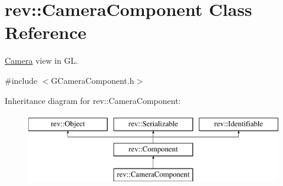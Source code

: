 \hypertarget{classrev_1_1_camera_component}{}\section{rev\+::Camera\+Component Class Reference}
\label{classrev_1_1_camera_component}


\mbox{\hyperlink{classrev_1_1_camera}{Camera}} view in GL.  




{\ttfamily \#include $<$G\+Camera\+Component.\+h$>$}

Inheritance diagram for rev\+::Camera\+Component\+:\begin{figure}[H]
\begin{center}
\leavevmode
\includegraphics[height=3.000000cm]{classrev_1_1_camera_component}
\end{center}
\end{figure}
